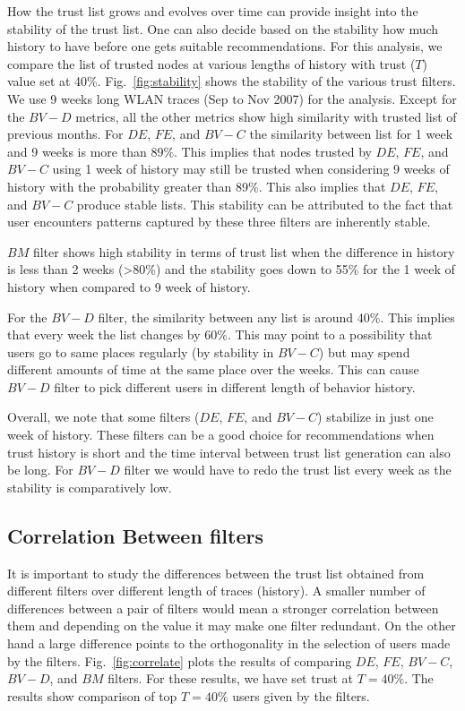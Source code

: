 \documentclass[10pt,conference]{IEEEtran}
\begin{document}
How the trust list grows and evolves over time can provide insight into the stability of the trust list. One can also decide based on the stability how much history to have before one gets suitable recommendations. For this analysis, we compare the list of trusted nodes at various lengths of history with trust ($T$) value set at 40\%. Fig.~\ref{fig:stability} shows the stability of the various trust filters. We use 9 weeks long WLAN traces (Sep to Nov 2007) for the analysis. Except for the $BV-D$ metrics, all the other metrics show high similarity with trusted list of previous months. For $DE$, $FE$, and $BV-C$ the similarity between list for 1 week and 9 weeks is more than $89\%$. This implies that nodes trusted by $DE$, $FE$, and $BV-C$ using 1 week of history may still be trusted when considering 9 weeks of history with the probability greater than 89\%. This also implies that $DE$, $FE$, and $BV-C$ produce stable lists. This stability can be attributed to the fact that user encounters patterns captured by these three filters are inherently stable. 

$BM$ filter shows high stability in terms of trust list when the difference in history is less than 2 weeks (\textgreater 80\%) and the stability goes down to 55\% for the 1 week of history when compared to 9 week of history. 

For the $BV-D$ filter, the similarity between any list is around 40\%. This implies that every week the list changes by 60\%. This may point to a possibility that users go to same places regularly (by stability in  $BV-C$) but may spend different amounts of time at the same place over the weeks. This can cause $BV-D$ filter to pick different users in different length of behavior history.

Overall, we note that some filters ($DE$, $FE$, and $BV-C$) stabilize in just one week of history. These filters can be a good choice for recommendations when trust history is short and the time interval between trust list generation can also be long. For $BV-D$ filter we would have to redo the trust list every week as the stability is comparatively low.




\subsection{Correlation Between filters}

It is important to study the differences between the trust list obtained from different filters over different length of traces (history). A smaller number of differences between a pair of filters would mean a stronger correlation between them and depending on the value it may make one filter redundant. On the other hand a large difference points to the orthogonality in the selection of users made by the filters. Fig.~\ref{fig:correlate} plots the results of comparing $DE$, $FE$, $BV-C$, $BV-D$,  and $BM$ filters. For these results, we have set trust at $T=40\%$. The results show comparison of top $T=40\%$ users given by the filters. 
\end{document}
